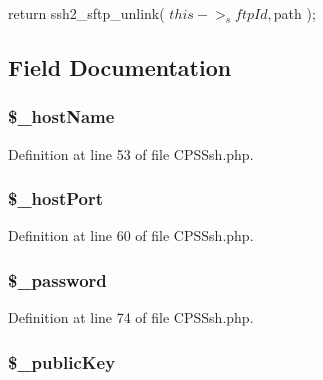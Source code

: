 \begin{DoxyCode}
    {
        return ssh2_sftp_unlink( $this->_sftpId, $path );
    }
\end{DoxyCode}




\subsection{Field Documentation}
\hypertarget{classCPSSsh_aea4d2182573f32e00024b6d3ab307669}{
\subsubsection[{\$\_\-hostName}]{\setlength{\rightskip}{0pt plus 5cm}\$\_\-hostName}}
\label{classCPSSsh_aea4d2182573f32e00024b6d3ab307669}


Definition at line 53 of file CPSSsh.php.

\hypertarget{classCPSSsh_a7144786d61ff1e88b8599df72eef589a}{
\subsubsection[{\$\_\-hostPort}]{\setlength{\rightskip}{0pt plus 5cm}\$\_\-hostPort}}
\label{classCPSSsh_a7144786d61ff1e88b8599df72eef589a}


Definition at line 60 of file CPSSsh.php.

\hypertarget{classCPSSsh_ab2d9cec4126c2a36b45c4e24bccc0be7}{
\subsubsection[{\$\_\-password}]{\setlength{\rightskip}{0pt plus 5cm}\$\_\-password}}
\label{classCPSSsh_ab2d9cec4126c2a36b45c4e24bccc0be7}


Definition at line 74 of file CPSSsh.php.

\hypertarget{classCPSSsh_aa75ed584b43a95e58e9d1a173036a6f8}{
\subsubsection[{\$\_\-publicKey}]{\setlength{\rightskip}{0pt plus 5cm}\$\_\-publicKey}}
\label{classCPSSsh_aa75ed584b43a95e58e9d1a173036a6f8}


